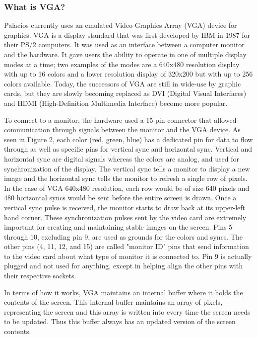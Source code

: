 \documentclass{acm_proc_article-sp}
\begin{document}
\subsubsection{What is VGA?}
Palacios currently uses an emulated Video Graphics Array (VGA) device for graphics. VGA is a display standard that was first developed by IBM in 1987 for their PS/2 computers. It was used as an interface between a computer monitor and the hardware. It gave users the ability to operate in one of multiple display modes at a time; two examples of the modes are a 640x480  resolution display with up to 16 colors and a lower resolution display of 320x200 but with up to 256 colors available.\cite{ibmvga} Today, the successors of VGA are still in wide-use by graphic cards, but they are slowly becoming replaced as DVI (Digital Visual Interfaces) and HDMI (High-Definition Multimedia Interface) become more popular.
\par
To connect to a monitor, the hardware used a 15-pin connector that allowed communication through signals between the monitor and the VGA device. As seen in Figure 2, each color (red, green, blue) has a dedicated pin for data to flow through as well as specific pins for vertical sync and horizontal sync.\cite{vgahead} Vertical and horizontal sync are digital signals whereas the colors are analog, and used for synchronization of the display. The vertical sync tells a monitor to display a new image and the horizontal sync tells the monitor to refresh a single row of pixels. In the case of VGA 640x480 resolution, each row would be of size 640 pixels and 480 horizontal syncs would be sent before the entire screen is drawn. Once a vertical sync pulse is received, the monitor starts to draw back at its upper-left hand corner. These synchronization pulses sent by the video card are extremely important for creating and maintaining stable images on the screen. Pins 5 through 10, excluding pin 9, are used as grounds for the colors and syncs. The other pins (4, 11, 12, and 15) are called "monitor ID" pins that send information to the video card about what type of monitor it is connected to.\cite{vgahead} Pin 9 is actually plugged and not used for anything, except in helping align the other pins with their respective sockets. 
\par
 In terms of how it works, VGA maintains an internal buffer where it holds the contents of the screen. This internal buffer maintains an array of pixels, representing the screen and this array is written into every time the screen needs to be updated. Thus this buffer always has an updated version of the screen contents.
\end{document}
